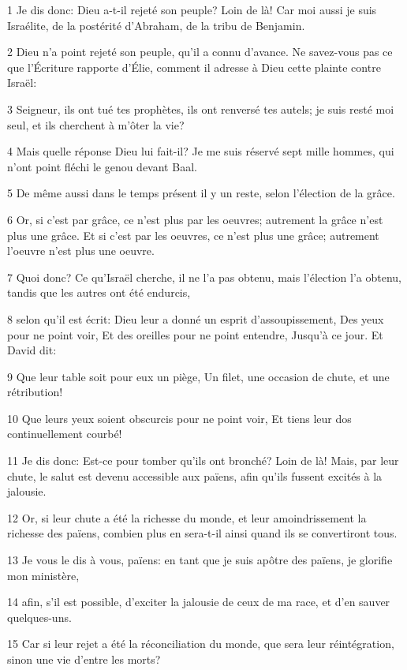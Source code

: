 \par 1 Je dis donc: Dieu a-t-il rejeté son peuple? Loin de là! Car moi aussi je suis Israélite, de la postérité d'Abraham, de la tribu de Benjamin.
\par 2 Dieu n'a point rejeté son peuple, qu'il a connu d'avance. Ne savez-vous pas ce que l'Écriture rapporte d'Élie, comment il adresse à Dieu cette plainte contre Israël:
\par 3 Seigneur, ils ont tué tes prophètes, ils ont renversé tes autels; je suis resté moi seul, et ils cherchent à m'ôter la vie?
\par 4 Mais quelle réponse Dieu lui fait-il? Je me suis réservé sept mille hommes, qui n'ont point fléchi le genou devant Baal.
\par 5 De même aussi dans le temps présent il y un reste, selon l'élection de la grâce.
\par 6 Or, si c'est par grâce, ce n'est plus par les oeuvres; autrement la grâce n'est plus une grâce. Et si c'est par les oeuvres, ce n'est plus une grâce; autrement l'oeuvre n'est plus une oeuvre.
\par 7 Quoi donc? Ce qu'Israël cherche, il ne l'a pas obtenu, mais l'élection l'a obtenu, tandis que les autres ont été endurcis,
\par 8 selon qu'il est écrit: Dieu leur a donné un esprit d'assoupissement, Des yeux pour ne point voir, Et des oreilles pour ne point entendre, Jusqu'à ce jour. Et David dit:
\par 9 Que leur table soit pour eux un piège, Un filet, une occasion de chute, et une rétribution!
\par 10 Que leurs yeux soient obscurcis pour ne point voir, Et tiens leur dos continuellement courbé!
\par 11 Je dis donc: Est-ce pour tomber qu'ils ont bronché? Loin de là! Mais, par leur chute, le salut est devenu accessible aux païens, afin qu'ils fussent excités à la jalousie.
\par 12 Or, si leur chute a été la richesse du monde, et leur amoindrissement la richesse des païens, combien plus en sera-t-il ainsi quand ils se convertiront tous.
\par 13 Je vous le dis à vous, païens: en tant que je suis apôtre des païens, je glorifie mon ministère,
\par 14 afin, s'il est possible, d'exciter la jalousie de ceux de ma race, et d'en sauver quelques-uns.
\par 15 Car si leur rejet a été la réconciliation du monde, que sera leur réintégration, sinon une vie d'entre les morts?
